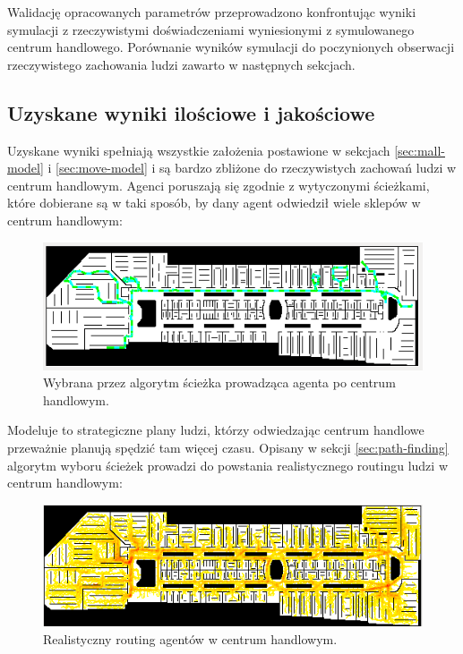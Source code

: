 \documentclass[a4paper, 12pt]{article}
\begin{document}
        Walidację opracowanych parametrów przeprowadzono konfrontując wyniki symulacji z rzeczywistymi doświadczeniami wyniesionymi z symulowanego centrum handlowego. Porównanie wyników symulacji do poczynionych obserwacji rzeczywistego zachowania ludzi zawarto w następnych sekcjach.

        \subsection{Uzyskane wyniki ilościowe i jakościowe}
        \label{sec:results}

        Uzyskane wyniki spełniają wszystkie założenia postawione w sekcjach \ref{sec:mall-model} i \ref{sec:move-model} i są bardzo zbliżone do rzeczywistych zachowań ludzi w centrum handlowym. Agenci poruszają się zgodnie z wytyczonymi ścieżkami, które dobierane są w taki sposób, by dany agent odwiedził wiele sklepów w centrum handlowym:

        \begin{figure}[H]
          \centering
          \includegraphics[scale=0.7]{./img/route.png}
          \caption{Wybrana przez algorytm ścieżka prowadząca agenta po centrum handlowym.}
          \label{fig:res-route}
        \end{figure}

\noindent
Modeluje to strategiczne plany ludzi, którzy odwiedzając centrum handlowe przeważnie planują spędzić tam więcej czasu. Opisany w sekcji \ref{sec:path-finding} algorytm wyboru ścieżek prowadzi do powstania realistycznego routingu ludzi w centrum handlowym:

        \begin{figure}[H]
          \centering
          \includegraphics[scale=0.7]{./img/routing.png}
          \caption{Realistyczny routing agentów w centrum handlowym.}
          \label{fig:res-routing}
        \end{figure}
\end{document}
